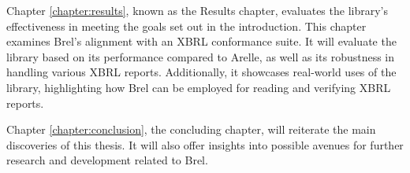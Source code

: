 Chapter \ref{chapter:results}, known as the Results chapter, 
evaluates the library's effectiveness in meeting the goals set out in the introduction. 
This chapter examines Brel's alignment with an XBRL conformance suite.
It will evaluate the library based on its performance compared to Arelle, 
as well as its robustness in handling various XBRL reports.
Additionally, it showcases real-world uses of the library, 
highlighting how Brel can be employed for reading and verifying XBRL reports.

Chapter \ref{chapter:conclusion}, the concluding chapter,
will reiterate the main discoveries of this thesis.
It will also offer insights into possible avenues for further research and development related to Brel.